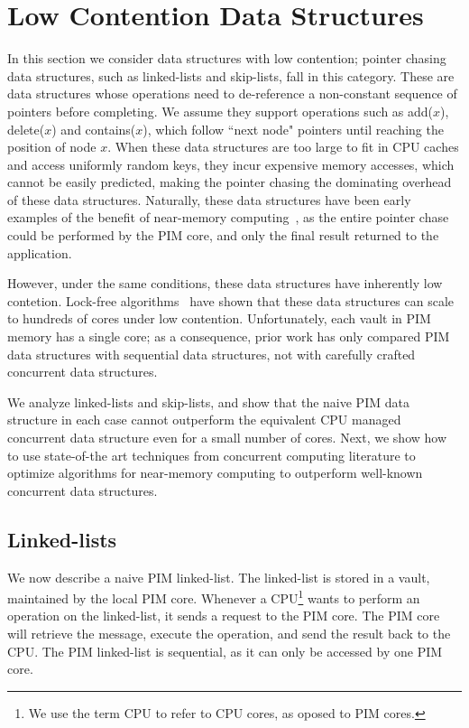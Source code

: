 
\section{Low Contention Data Structures}
\label{section:pointer_chasing}

In this section we consider data structures with low contention; pointer chasing data structures, 
such as linked-lists and skip-lists, fall in this category.  
These are data structures whose operations  
need to de-reference a non-constant sequence of pointers before completing. We assume they support operations 
such as add($x$), delete($x$) and contains($x$), which follow ``next node" pointers until 
reaching the position of node $x$.
When these data structures are too large to fit in CPU caches 
and access uniformly random keys,
they incur expensive memory accesses, which cannot
be easily predicted, making the pointer chasing the dominating overhead of these data structures.
Naturally, these data structures have been early examples of the benefit of near-memory 
computing~\cite{hsieh2016accelerating}, as the entire pointer chase could be performed by the PIM core, and only the final result returned to 
the application. 

However, under the same conditions, these data structures have inherently low contetion. Lock-free algorithms~\cite{}
have shown that these data structures can scale to hundreds of cores under low contention. Unfortunately, each vault in 
PIM memory has a single core; as a consequence, prior work 
has only compared PIM data structures with sequential data structures, 
not with carefully crafted concurrent data structures.

We analyze linked-lists and skip-lists, and show that the naive PIM data structure in each case cannot 
outperform the equivalent CPU managed concurrent data structure even for a small number of cores. Next, 
we show how to use state-of-the art techniques from concurrent computing literature to 
optimize algorithms for near-memory computing to outperform well-known concurrent data 
structures. 

\subsection{Linked-lists}
\label{section:linked_list}
We now describe a naive PIM linked-list.
The linked-list is stored in a vault, maintained by the local PIM core.
Whenever a CPU\footnote{We use the term CPU to refer to CPU cores, as oposed to PIM cores.} 
wants to perform an operation on the linked-list,
it sends a request to the PIM core.
The PIM core will retrieve the message, execute the operation, and send the result back to the CPU.
The PIM linked-list is sequential, as it can only be accessed by one PIM core. 

